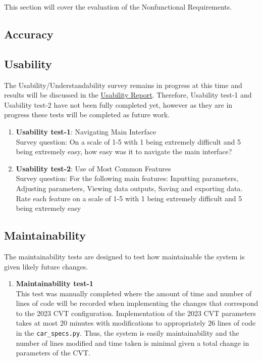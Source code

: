 \documentclass[12pt, titlepage]{article}
\begin{document}
This section will cover the evaluation of the Nonfunctional Requirements. 

\subsection{Accuracy}
		
\subsection{Usability}
The Usability/Understandability survey remains in progress at this time and results will be discussed in the \href{file:../UsabilityReport/UsabilityReport.pdf}{Usability Report}. 
Therefore, Usability test-1 and Usability test-2 have not been fully completed yet, however as they are in progress these tests will be completed as future work. 

\begin{enumerate}
\item{\textbf{Usability test-1}: Navigating Main Interface}\\
Survey question: On a scale of 1-5 with 1 being extremely difficult and 5 being extremely easy, how easy was it to navigate the main interface? 
\item{\textbf{Usability test-2}: Use of Most Common Features}\\
Survey question: For the following main features: Inputting parameters, Adjusting parameters, Viewing data outputs, Saving and exporting data. 
Rate each feature on a scale of 1-5 with 1 being extremely difficult and 5 being extremely easy
\end{enumerate}

\subsection{Maintainability}
The maintainability tests are designed to test how maintainable the system is given likely future changes.
\begin{enumerate}
\item{\textbf{Maintainability test-1}}\\
This test was manually completed where the amount of time and number of lines of code
will be recorded when implementing the changes that correspond to the 2023 CVT configuration. 
Implementation of the 2023 CVT parameters takes at most 20 minutes with modifications to appropriately 26 lines of code in the \texttt{car\_specs.py}.
Thus, the system is easily maintainability and the number of lines modified and time taken is minimal given a total change in parameters of the CVT. 
\end{enumerate}
\end{document}
